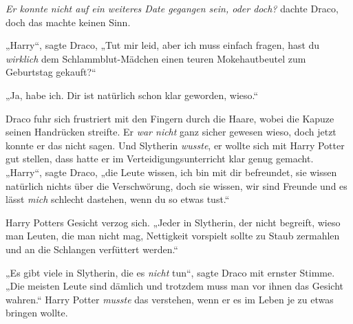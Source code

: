 \emph{Er konnte nicht auf ein weiteres Date gegangen sein, oder doch?} dachte Draco, doch das machte keinen Sinn.

„Harry“, sagte Draco,
„Tut mir leid, aber ich muss einfach fragen, hast du \emph{wirklich} dem Schlammblut-Mädchen einen teuren Mokehautbeutel zum Geburtstag gekauft?“

„Ja, habe ich. Dir ist natürlich schon klar geworden, wieso.“

Draco fuhr sich frustriert mit den Fingern durch die Haare, wobei die Kapuze seinen Handrücken streifte. Er \emph{war nicht} ganz sicher gewesen wieso, doch jetzt konnte er das nicht sagen. Und Slytherin \emph{wusste}, er wollte sich mit Harry Potter gut stellen, dass hatte er im Verteidigungsunterricht klar genug gemacht.
„Harry“, sagte Draco, „die Leute wissen, ich bin mit dir befreundet, sie wissen natürlich nichts über die Verschwörung, doch sie wissen, wir sind Freunde und es lässt \emph{mich} schlecht dastehen, wenn du so etwas tust.“

Harry Potters Gesicht verzog sich.
„Jeder in Slytherin, der nicht begreift, wieso man Leuten, die man nicht mag, Nettigkeit vorspielt sollte zu Staub zermahlen und an die Schlangen verfüttert werden.“

„Es gibt viele in Slytherin, die es \emph{nicht} tun“, sagte Draco mit ernster Stimme.
„Die meisten Leute sind dämlich und trotzdem muss man vor ihnen das Gesicht wahren.“ Harry Potter \emph{musste} das verstehen, wenn er es im Leben je zu etwas bringen wollte.

